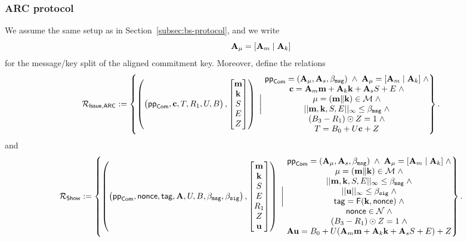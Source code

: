\subsubsection{ARC protocol}
\label{subsec:arc-protocol}
We assume the same setup as in Section~\ref{subsec:bs-protocol}, and we write
\[
\mathbf{A}_\mu=[\mathbf{A}_m\mid \mathbf{A}_k]
\]
for the message/key split of the aligned commitment key. Moreover, define the relations
\[
\mathcal{R}_{\mathsf{Issue,ARC}}:=\left\{ \left(
\begin{pmatrix}
\mathsf{pp}_{\mathsf{Com}},\mathbf{c},T,R_1,U,B
\end{pmatrix},
\begin{bmatrix}
\mathbf{m}\\ \mathbf{k}\\ S\\ E\\ Z
\end{bmatrix}\right)
~\bigg |~
\begin{matrix}
\mathsf{pp}_{\mathsf{Com}}=(\mathbf{A}_\mu,\mathbf{A}_s,\beta_{\mathtt{msg}}) \;\land\; \mathbf{A}_\mu=[\mathbf{A}_m\mid \mathbf{A}_k] \;\land\\
\mathbf{c} = \mathbf{A}_m\mathbf{m} + \mathbf{A}_k\mathbf{k} + \mathbf{A}_s S + E \;\land\\
\mathbf{\mu}=(\mathbf{m}\Vert \mathbf{k})\in \mathcal M \;\land\\
||\mathbf{m},\mathbf{k},S,E||_{\infty} \leq \beta_{\mathtt{msg}} \;\land\\
(B_3-R_1)\odot Z = 1 \;\land\\
T = B_0 + U\mathbf{c} + Z
\end{matrix}
\right\}.
\]
and
\[
\mathcal{R}_{\mathsf{Show}} :=\left\{ \left(
\begin{pmatrix}
\mathsf{pp}_{\mathsf{Com}},\mathsf{nonce},\mathsf{tag},\mathbf{A},U,B,\beta_{\mathtt{msg}},\beta_{\mathtt{sig}}
\end{pmatrix},
\begin{bmatrix}
\mathbf{m}\\ \mathbf{k}\\ S\\ E\\ R_1\\ Z\\ \mathbf{u}
\end{bmatrix}\right)
~\bigg |~
\begin{matrix}
\mathsf{pp}_{\mathsf{Com}}=(\mathbf{A}_\mu,\mathbf{A}_s,\beta_{\mathtt{msg}}) \;\land\; \mathbf{A}_\mu=[\mathbf{A}_m\mid \mathbf{A}_k] \;\land\\
\mathbf{\mu}=(\mathbf{m}\Vert \mathbf{k})\in \mathcal M \;\land\\
||\mathbf{m},\mathbf{k},S,E||_{\infty} \leq \beta_{\mathtt{msg}} \;\land\\
||\mathbf{u}||_\infty \leq \beta_{\mathtt{sig}} \;\land\\
\mathsf{tag} = \mathsf{F}(\mathbf{k},\mathsf{nonce}) \;\land\\
\mathsf{nonce} \in \mathcal{N} \;\land\\
(B_3-R_1)\odot Z = 1 \;\land\\
\mathbf{A} \mathbf{u} = B_0 + U(\mathbf{A}_m\mathbf{m} + \mathbf{A}_k\mathbf{k} + \mathbf{A}_s S + E) + Z
\end{matrix}
\right\}.
\]


